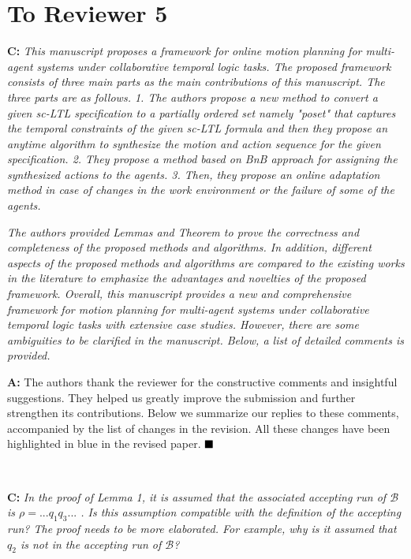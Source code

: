 \documentclass[10pt]{article}
\begin{document}


\newpage
\section*{To Reviewer 5}

\textbf{C:}
\emph{This manuscript proposes a framework for online motion planning for
	multi-agent systems under collaborative temporal logic tasks. The
	proposed framework consists of three main parts as the main
	contributions of this manuscript. The three parts are as follows. 1.
	The authors propose a new method to convert a given sc-LTL
	specification to a partially ordered set namely "poset" that captures
	the temporal constraints of the given sc-LTL formula and then they
	propose an anytime algorithm to synthesize the motion and action
	sequence for the given specification. 2. They propose a method based on
	BnB approach for assigning the synthesized actions to the agents. 3.
	Then, they propose an online adaptation method in case of changes in
	the work environment or the failure of some of the agents. }

\emph{	The authors provided Lemmas and Theorem to prove the correctness and
	completeness of the proposed methods and algorithms. In addition,
	different aspects of the proposed methods and algorithms are compared
	to the existing works in the literature to emphasize the advantages and
	novelties of the proposed framework. Overall, this manuscript provides
	a new and comprehensive framework for motion planning for multi-agent
	systems under collaborative temporal logic tasks with extensive case
	studies.  However, there are some ambiguities to be clarified in the
	manuscript. Below, a list of detailed comments is provided.}

\textbf{A:}
The authors thank the reviewer for the constructive comments and insightful suggestions.
They helped us greatly improve the submission and further strengthen its contributions.
Below we summarize our replies to these comments, accompanied by the list of changes in the revision.
All these changes have been highlighted in blue in the revised paper.
$\hfill\blacksquare$

\hspace*{\fill} \


\textbf{C:}
\emph{In the proof of Lemma 1, it is assumed that the associated accepting
	run of $\mathcal{B}$ is $\rho=...q_1q_3...$ . Is this assumption compatible
	with the definition of the accepting run? The proof needs to be more
	elaborated. For example, why is it assumed that $q_2$ is not in the
	accepting run of $\mathcal{B}$?}
\end{document}
